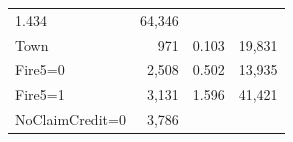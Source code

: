 \documentclass[]{book}
\begin{document}
\begin{longtable}[]{@{}lrrr@{}}
\begin{minipage}[t]{0.15\columnwidth}
1.434\strut
\end{minipage} & \begin{minipage}[t]{0.15\columnwidth}\raggedleft\strut
64,346\strut
\end{minipage}\tabularnewline
\begin{minipage}[t]{0.27\columnwidth}\raggedright\strut
Town\strut
\end{minipage} & \begin{minipage}[t]{0.15\columnwidth}\raggedleft\strut
971\strut
\end{minipage} & \begin{minipage}[t]{0.15\columnwidth}\raggedleft\strut
0.103\strut
\end{minipage} & \begin{minipage}[t]{0.15\columnwidth}\raggedleft\strut
19,831\strut
\end{minipage}\tabularnewline
\begin{minipage}[t]{0.27\columnwidth}\raggedright\strut
Fire5=0\strut
\end{minipage} & \begin{minipage}[t]{0.15\columnwidth}\raggedleft\strut
2,508\strut
\end{minipage} & \begin{minipage}[t]{0.15\columnwidth}\raggedleft\strut
0.502\strut
\end{minipage} & \begin{minipage}[t]{0.15\columnwidth}\raggedleft\strut
13,935\strut
\end{minipage}\tabularnewline
\begin{minipage}[t]{0.27\columnwidth}\raggedright\strut
Fire5=1\strut
\end{minipage} & \begin{minipage}[t]{0.15\columnwidth}\raggedleft\strut
3,131\strut
\end{minipage} & \begin{minipage}[t]{0.15\columnwidth}\raggedleft\strut
1.596\strut
\end{minipage} & \begin{minipage}[t]{0.15\columnwidth}\raggedleft\strut
41,421\strut
\end{minipage}\tabularnewline
\begin{minipage}[t]{0.27\columnwidth}\raggedright\strut
NoClaimCredit=0\strut
\end{minipage} & \begin{minipage}[t]{0.15\columnwidth}\raggedleft\strut
3,786\strut
\end{minipage} & \begin{minipage}[t]{0.15\columnwidth}\raggedleft\strut

\end{minipage}
\end{longtable}
\end{document}
